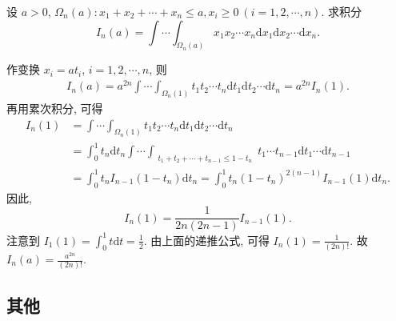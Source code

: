 \documentclass[../../main.tex]{subfiles}%
\begin{document}
\begin{example}
设 \( a > 0 \), \( \Omega_n(a) : x_1 + x_2 + \cdots + x_n \leqslant a, x_i \geqslant 0\ (i = 1,2,\cdots,n) \). 求积分
\[
I_n(a) = \int \cdots \int_{\Omega_n(a)} x_1 x_2 \cdots x_n \mathrm{d}x_1 \mathrm{d}x_2 \cdots \mathrm{d}x_n.
\]
\end{example}
\begin{solution}
作变换 \( x_i = a t_i \), \( i = 1,2,\cdots,n \), 则
\begin{align*}
I_n(a) = a^{2n} \int \cdots \int_{\Omega_n(1)} t_1 t_2 \cdots t_n \mathrm{d}t_1 \mathrm{d}t_2 \cdots \mathrm{d}t_n = a^{2n} I_n(1).
\end{align*}
再用累次积分, 可得
\begin{align*}
I_n(1) &= \int \cdots \int_{\Omega_n(1)} t_1 t_2 \cdots t_n \mathrm{d}t_1 \mathrm{d}t_2 \cdots \mathrm{d}t_n
\\
&= \int_0^1 t_n \mathrm{d}t_n \int \cdots \int_{\substack{t_1 + t_2 + \cdots + t_{n-1} \leqslant 1 - t_n}} t_1 \cdots t_{n-1} \mathrm{d}t_1 \cdots \mathrm{d}t_{n-1}
\\
&= \int_0^1 t_n I_{n-1}(1 - t_n) \mathrm{d}t_n = \int_0^1 t_n (1 - t_n)^{2(n-1)} I_{n-1}(1) \mathrm{d}t_n.
\end{align*}
因此,
\[
I_n(1) = \frac{1}{2n(2n - 1)} I_{n-1}(1).
\]
注意到 \( I_1(1) = \int_0^1 t \mathrm{d}t = \frac{1}{2} \). 由上面的递推公式, 可得 \( I_n(1) = \frac{1}{(2n)!} \). 故 \( I_n(a) = \frac{a^{2n}}{(2n)!} \).

\end{solution}












\subsection{其他}
\end{document}
